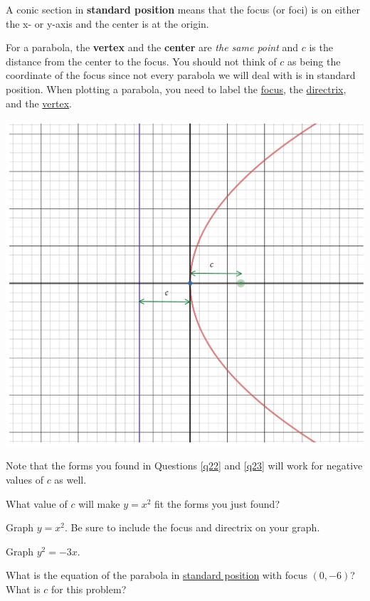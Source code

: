 \begin{info} A conic section in \textbf{standard position} means that the focus (or foci) is on either the x- or y-axis and the center is at the origin.

For a parabola, the \textbf{vertex} and the \textbf{center} are \emph{the same point} and $c$ is the distance from the center to the focus. You should not think of $c$ as being the coordinate of the focus since not every parabola we will deal with is in standard position. When plotting a parabola, you need to label the \underline{focus}, the \underline{directrix}, and the \underline{vertex}.

\begin{center} \includegraphics[scale=.4]{parabolasp.png} \end{center}

Note that the forms you found in Questions \ref{q22} and \ref{q23} will work for negative values of $c$ as well.
\end{info}

\bq
\be
\item What value of $c$ will make $y=x^2$ fit the forms you just found?
\item Graph $y=x^2$. Be sure to include the focus and directrix on your graph.
\ee
\eq

\question Graph $y^2=-3x$.

\question What is the equation of the parabola in \underline{standard position} with focus $(0,-6)$? What is $c$ for this problem?

